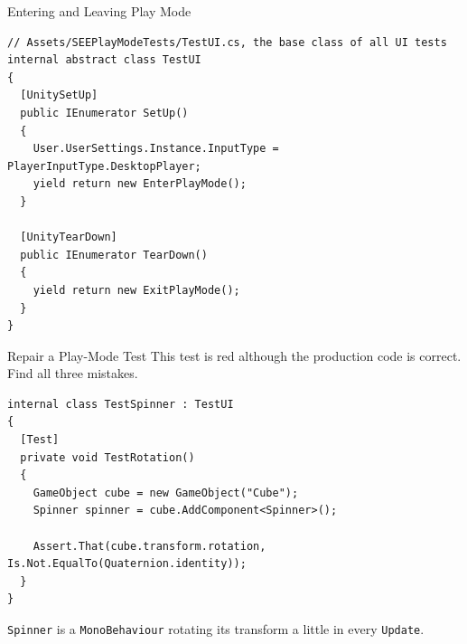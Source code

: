 \begin{frame}[fragile]{Entering and Leaving Play Mode}
  \begin{lstlisting}[basicstyle=\scriptsize\ttfamily]
// Assets/SEEPlayModeTests/TestUI.cs, the base class of all UI tests
internal abstract class TestUI
{
  [UnitySetUp]
  public IEnumerator SetUp()
  {
    User.UserSettings.Instance.InputType = PlayerInputType.DesktopPlayer;
    yield return new EnterPlayMode();
  }

  [UnityTearDown]
  public IEnumerator TearDown()
  {
    yield return new ExitPlayMode();
  }
}
  \end{lstlisting}

\end{frame}

\begin{exerciseframe}{Repair a Play-Mode Test}
  This test is red although the production code is correct. Find all three
  mistakes.
  \vspace{1ex}

  \begin{lstlisting}[basicstyle=\scriptsize\ttfamily]
internal class TestSpinner : TestUI
{
  [Test]
  private void TestRotation()
  {
    GameObject cube = new GameObject("Cube");
    Spinner spinner = cube.AddComponent<Spinner>();

    Assert.That(cube.transform.rotation, Is.Not.EqualTo(Quaternion.identity));
  }
}
  \end{lstlisting}
  \vspace{1ex}

  \texttt{Spinner} is a \texttt{MonoBehaviour} rotating its transform a little
  in every \texttt{Update}.
\end{exerciseframe}


